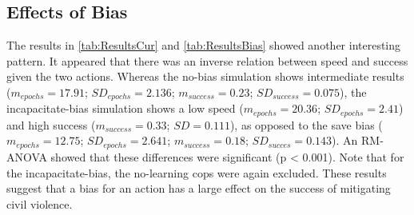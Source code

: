 \subsection{Effects of Bias}
The results in \autoref{tab:ResultsCur} and \autoref{tab:ResultsBias} showed another interesting pattern. It appeared that there was an inverse relation between speed and success given the two actions. Whereas the no-bias simulation shows intermediate results ($m_{epochs} = 17.91$; $SD_{epochs} = 2.136$; $m_{success} = 0.23$; $SD_{success} = 0.075$), the incapacitate-bias simulation shows a low speed ($m_{epochs} = 20.36$; $SD_{epochs} = 2.41$) and high success ($m_{success} = 0.33$; $SD = 0.111$), as opposed to the save bias ($m_{epochs} = 12.75$; $SD_{epochs} = 2.641$; $m_{success} = 0.18$; $SD_{succes} = 0.143$). An RM-ANOVA showed that these differences were significant (p < 0.001). Note that for the incapacitate-bias, the no-learning cops were again excluded. These results suggest that a bias for an action has a large effect on the success of mitigating civil violence.


